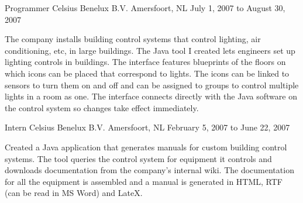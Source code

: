 \documentclass[11pt, letterpaper]{awesome-cv}
\begin{document}
\begin{cventries}
        \cventry
            {Programmer} %
            {Celsius Benelux B.V.} %
            {Amersfoort, NL} %
            {July 1, 2007 to August 30, 2007} %
            {
              \begin{cvitems} %
              \item {The company installs building control systems that control
                lighting, air conditioning, etc, in large buildings.
                The Java tool I created lets engineers set up lighting controls in
                buildings. The interface features blueprints of the floors on which
                icons can be placed that correspond to lights. The icons can be
                linked to sensors to turn them on and off and can be assigned to
                groups to control multiple lights in a room as one.
                The interface connects directly with the Java software on the
                control system so changes take effect immediately.}
              \end{cvitems}
            }

            \cventry
                {Intern} %
                {Celsius Benelux B.V.} %
                {Amersfoort, NL} %
                {February 5, 2007 to June 22, 2007} %
                {
                  \begin{cvitems} %
                  \item {Created a Java application that generates manuals for
                    custom building control systems. The tool queries the control system
                    for equipment it controls and downloads documentation from the
                    company's internal wiki. The documentation for all the equipment is
                    assembled and a manual is generated in HTML, RTF (can be read in MS
                    Word) and LateX.}
                  \end{cvitems} 
                }


\end{cventries}
\end{document}
